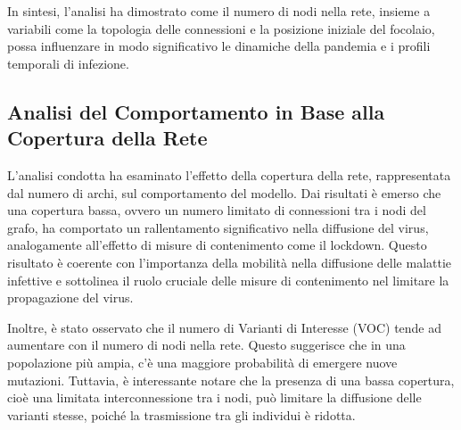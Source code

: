 In sintesi, l'analisi ha dimostrato come il numero di nodi nella rete, 
insieme a variabili come la topologia delle connessioni e la posizione 
iniziale del focolaio, possa influenzare in modo significativo le 
dinamiche della pandemia e i profili temporali di infezione.

\subsection{Analisi del Comportamento in Base alla Copertura della Rete}

L'analisi condotta ha esaminato l'effetto della copertura della rete, 
rappresentata dal numero di archi, sul comportamento del modello. 
Dai risultati è emerso che una copertura bassa, ovvero un numero 
limitato di connessioni tra i nodi del grafo, ha comportato un 
rallentamento significativo nella diffusione del virus, analogamente 
all'effetto di misure di contenimento come il lockdown. 
Questo risultato è coerente con l'importanza della mobilità nella 
diffusione delle malattie infettive e sottolinea il ruolo cruciale 
delle misure di contenimento nel limitare la propagazione del virus.

Inoltre, è stato osservato che il numero di Varianti di Interesse 
(VOC) tende ad aumentare con il numero di nodi nella rete. 
Questo suggerisce che in una popolazione più ampia, c'è una maggiore 
probabilità di emergere nuove mutazioni. Tuttavia, è interessante 
notare che la presenza di una bassa copertura, cioè una limitata 
interconnessione tra i nodi, può limitare la diffusione delle varianti 
stesse, poiché la trasmissione tra gli individui è ridotta.

